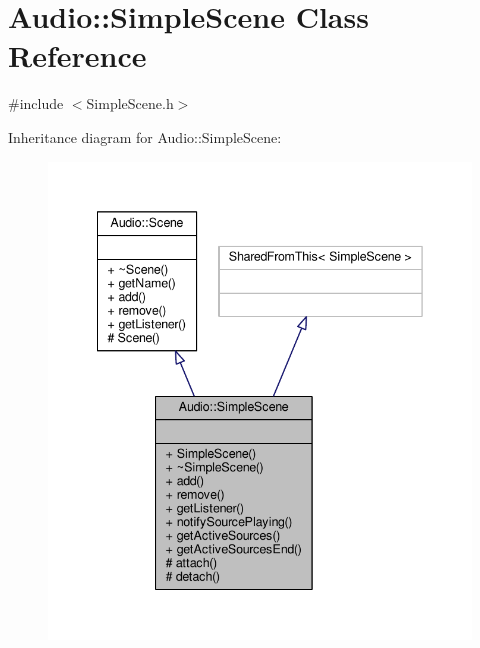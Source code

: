 \hypertarget{classAudio_1_1SimpleScene}{}\section{Audio\+:\+:Simple\+Scene Class Reference}
\label{classAudio_1_1SimpleScene}


{\ttfamily \#include $<$Simple\+Scene.\+h$>$}



Inheritance diagram for Audio\+:\+:Simple\+Scene\+:
\nopagebreak
\begin{figure}[H]
\begin{center}
\leavevmode
\includegraphics[width=342pt]{d0/d7f/classAudio_1_1SimpleScene__inherit__graph}
\end{center}
\end{figure}


